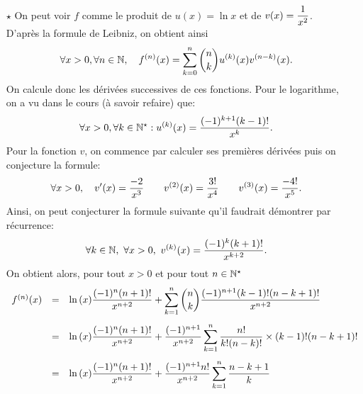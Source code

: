 \documentclass[a4paper, 11pt,reqno]{article}
\begin{document}
\begin{correction}
\begin{enumerate}
\begin{itemize}
			      \item[$\star$] On peut voir $f$ comme le produit de $u(x)=\ln{x}$ et de $v(x)=\displaystyle\frac{1}{x^2}$. D'apr\`es la formule de Leibniz, on obtient ainsi
			            $$\forall x>0,\forall n\in\mathbb{N},\quad f^{(n)}(x)=\sum\limits_{k=0}^n \displaystyle \binom{n}{k} u^{(k)}(x)v^{(n-k)}(x).$$
			            On calcule donc les d\'eriv\'ees successives de ces fonctions. Pour le logarithme, on a vu dans le cours (\`a savoir refaire) que:
			            $$\forall x>0,\forall k\in\mathbb{N}^{\star}: u^{(k)}(x)=\displaystyle\frac{(-1)^{k+1} (k-1)! }{x^k}.$$
			            Pour la fonction $v$, on commence par calculer ses premi\`eres d\'eriv\'ees puis on conjecture la formule:
			            $$\forall x>0,\quad v^{\prime}(x)=\displaystyle\frac{-2}{x^3}\qquad v^{(2)}(x)=\displaystyle\frac{3!}{x^4}\qquad v^{(3)}(x)=\displaystyle\frac{-4!}{x^5}.$$
			            Ainsi, on peut conjecturer la formule suivante qu'il faudrait d\'emontrer par r\'ecurrence:
			            $$\forall k\in\mathbb{N},\ \forall x>0,\  v^{(k)}(x)=\displaystyle\frac{(-1)^k (k+1)! }{x^{k+2}}.$$
			            On obtient alors, pour tout $x>0$ et pour tout $n\in\mathbb{N}^{\star}$
			            $$\begin{array}{lll}
					            f^{(n)}(x) & = & \ln{(x)}\ddp\frac{(-1)^n (n+1)!}{x^{n+2}}+\sum\limits_{k=1}^n \ddp \binom{n}{k}\ddp\frac{(-1)^{n+1}(k-1)!(n-k+1)!   }{ x^{n+2}}\vsec            \\
					                       & = & \ln{(x)}\ddp\frac{(-1)^n (n+1)!}{x^{n+2}}+  \ddp\frac{(-1)^{n+1}}{x^{n+2}} \sum\limits_{k=1}^n \ddp\frac{n!}{k!(n-k)!}\times(k-1)!(n-k+1)!\vsec \\
					                       & = & \ln{(x)}\ddp\frac{(-1)^n (n+1)!}{x^{n+2}}+  \ddp\frac{(-1)^{n+1}n!}{x^{n+2}} \sum\limits_{k=1}^n \ddp\frac{n-k+1}{k}
				            \end{array}$$
		      \end{itemize}

\end{enumerate}
\end{correction}
\end{document}

